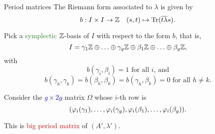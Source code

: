 \documentclass[usenames,dvipsnames]{beamer}
\newcommand{\red}[1]{\textcolor{red}{#1}}
\newcommand{\blue}[1]{\textcolor{blue}{#1}}
\newcommand{\green}[1]{\textcolor{ForestGreen}{#1}}
\begin{document}
\begin{frame}{ Period matrices }
   The Riemann form associated to $\lambda$ is given by
   \[ b:I\times I \to \mathbb{Z} \quad (s,t)\mapsto \operatorname{Tr}(\overline{t\lambda}s). \]
    
   \pause Pick a \green{symplectic} $\mathbb{Z}$-basis of $I$ with respect to the form $b$, that is,
    \[ I = \gamma_1 \mathbb{Z} \oplus \ldots \oplus \gamma_g \mathbb{Z} \oplus \beta_1 \mathbb{Z} \oplus \ldots \oplus \beta_g \mathbb{Z}, \]
    \pause with
    \[ b(\gamma_i,\beta_i)=1 \text{ for all $i$, and}\]
    \[b(\gamma_h,\gamma_k)=b(\beta_h,\beta_k)=b(\gamma_h,\beta_k)=0 \text{ for all $h\neq k$}. \]
    
    \pause Consider the \blue{$g\times 2g$} matrix $\Omega$ whose $i$-th row is 
    \[({\varphi}_i(\gamma_1),\ldots,{\varphi}_i(\gamma_g),{\varphi}_i(\beta_1),\ldots,{\varphi}_i(\beta_g)).\]
    
    \pause This is \red{big period matrix} of $(A',\lambda')$.
\end{frame}
    
\end{document}
